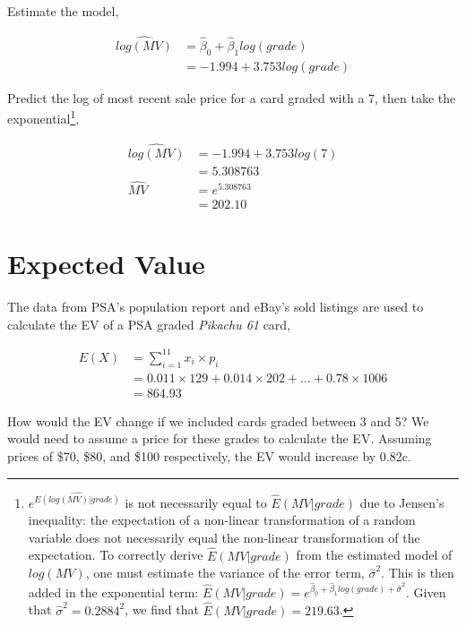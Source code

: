 \documentclass{article}
\begin{document}
Estimate the model,

\begin{align*}
    \widehat{log(MV)} &= \hat{\beta}_0 + \hat{\beta}_1 log(grade) \\
                      &= -1.994 + 3.753 log(grade)
\end{align*}

Predict the log of most recent sale price for a card graded with a 7, then take the exponential\footnote{$e^{\widehat{E(log(MV)|grade)}}$ is not necessarily equal to $\hat{E}(MV|grade)$ due to Jensen's inequality: the expectation of a non-linear transformation of a random variable does not necessarily equal the non-linear transformation of the expectation. To correctly derive $\hat{E}(MV|grade)$ from the estimated model of $log(MV)$, one must estimate the variance of the error term, $\hat{\sigma}^2$. This is then added in the exponential term: $\hat{E}(MV|grade) = e^{ \hat{\beta}_0 + \hat{\beta}_1 log(grade) + \hat{\sigma}^2}$. Given that $\hat{\sigma}^2 = 0.2884^2$, we find that $\hat{E}(MV|grade) = 219.63$.},

\begin{align*}
    \widehat{log(MV)} &= -1.994 + 3.753 log(7) \\
                      &= 5.308763 \\
             \widehat{MV} &=  e^{5.308763} \\
                      &=  202.10
\end{align*}

\section{Expected Value}

The data from PSA's population report and eBay's sold listings are used to calculate the EV of a PSA graded \textit{Pikachu 61} card,

\begin{align*}
    E(X) &= \sum_{i = 1}^{11} x_i \times p_i \\
         &= 0.011 \times 129 + 0.014 \times 202 + \dots + 0.78 \times 1006 \\
         &= 864.93
\end{align*}

How would the EV change if we included cards graded between 3 and 5? We would need to assume a price for these grades to calculate the EV. Assuming prices of \$70, \$80, and \$100 respectively, the EV would increase by 0.82c.
\end{document}
